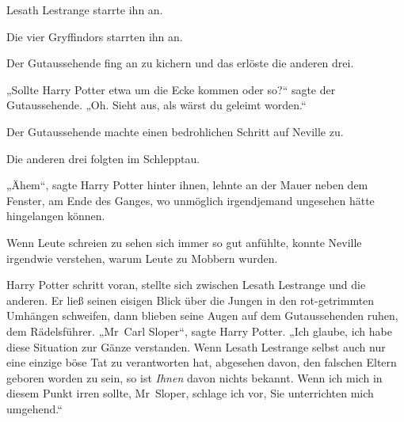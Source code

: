 Lesath Lestrange starrte ihn an.

Die vier Gryffindors starrten ihn an.

Der Gutaussehende fing an zu kichern und das erlöste die anderen drei.

„Sollte Harry Potter etwa um die Ecke kommen oder so?“ sagte der Gutaussehende. „Oh. Sieht aus, als wärst du geleimt worden.“

Der Gutaussehende machte einen bedrohlichen Schritt auf Neville zu.

Die anderen drei folgten im Schlepptau.

„Ähem“, sagte Harry Potter hinter ihnen, lehnte an der Mauer neben dem Fenster, am Ende des Ganges, wo unmöglich irgendjemand ungesehen hätte hingelangen können.

Wenn Leute schreien zu sehen sich immer so gut anfühlte, konnte Neville irgendwie verstehen, warum Leute zu Mobbern wurden.

Harry Potter schritt voran, stellte sich zwischen Lesath Lestrange und die anderen. Er ließ seinen eisigen Blick über die Jungen in den rot-getrimmten Umhängen schweifen, dann blieben seine Augen auf dem Gutaussehenden ruhen, dem Rädelsführer. „Mr~Carl Sloper“, sagte Harry Potter. „Ich glaube, ich habe diese Situation zur Gänze verstanden. Wenn Lesath Lestrange selbst auch nur eine einzige böse Tat zu verantworten hat, abgesehen davon, den falschen Eltern geboren worden zu sein, so ist \emph{Ihnen} davon nichts bekannt. Wenn ich mich in diesem Punkt irren sollte, Mr~Sloper, schlage ich vor, Sie unterrichten mich umgehend.“

